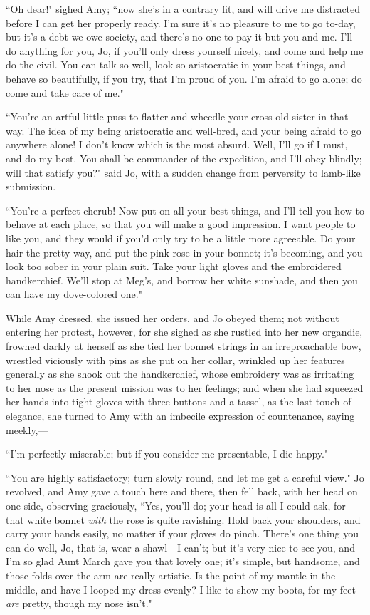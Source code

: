 ``Oh dear!" sighed Amy; ``now she's in a contrary fit, and
will drive me distracted before I can get her properly ready.
I'm sure it's no pleasure to me to go
to-day, but it's a debt we owe society, and
there's no one to pay it but you and me.
I'll do anything for you, Jo, if you'll
only dress yourself nicely, and come and help me do the civil. You can
talk so well, look so aristocratic in your best things, and behave so
beautifully, if you try, that I'm proud of you.
I'm afraid to go alone; do come and take care of me."

``You're an artful little puss to flatter and wheedle
your cross old sister in that way. The idea of my being aristocratic and
well-bred, and your being afraid to go anywhere alone! I
don't know which is the most absurd. Well,
I'll go if I must, and do my best. You shall be
commander of the expedition, and I'll obey blindly; will
that satisfy you?" said Jo, with a sudden change from perversity to
lamb-like submission.

``You're a perfect cherub! Now put on all your best
things, and I'll tell you how to behave at each place,
so that you will make a good impression. I want people to like you, and
they would if you'd only try to be a little more
agreeable. Do your hair the pretty way, and put the pink rose in your
bonnet; it's becoming, and you look too sober in your
plain suit. Take your light gloves and the embroidered handkerchief.
We'll stop at Meg's, and borrow her
white sunshade, and then you can have my dove-colored one."

While Amy dressed, she issued her orders, and Jo obeyed them; not
without entering her protest, however, for she sighed as she rustled
into her new organdie, frowned darkly at herself as she tied her bonnet
strings in an irreproachable bow, wrestled viciously with pins as she
put on her collar, wrinkled up her features generally as she shook out
the handkerchief, whose embroidery was as irritating to her nose as the
present mission was to her feelings; and when she had squeezed her hands
into tight gloves with three buttons and a tassel, as the last touch of
elegance, she turned to Amy with an imbecile expression of countenance,
saying meekly,---

``I'm perfectly miserable; but if you consider me
presentable, I die happy."

``You are highly satisfactory; turn slowly round, and let me get a
careful view." Jo revolved, and Amy gave a touch here and there, then
fell back, with her head on one side, observing graciously, ``Yes,
you'll do; your head is all I could ask, for that white
bonnet \emph{with} the rose is quite ravishing. Hold back your
shoulders, and carry your hands easily, no matter if your gloves do
pinch. There's one thing you can do well, Jo, that is,
wear a shawl---I can't; but it's very
nice to see you, and I'm so glad Aunt March gave you
that lovely one; it's simple, but handsome, and those
folds over the arm are really artistic. Is the point of my mantle in the
middle, and have I looped my dress evenly? I like to show my boots, for
my feet \emph{are} pretty, though my nose isn't."

